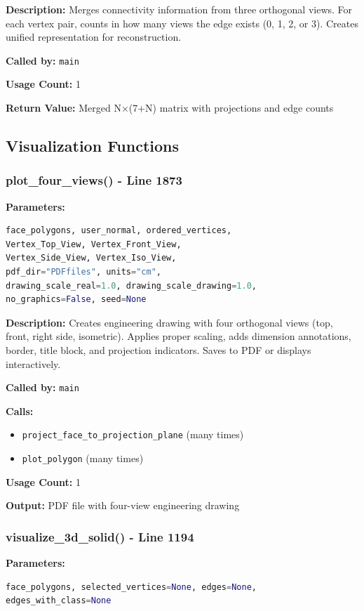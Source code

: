 \documentclass[11pt,a4paper]{article}
\begin{document}
\textbf{Description:}
Merges connectivity information from three orthogonal views. For each vertex pair, counts in how many views the edge exists (0, 1, 2, or 3). Creates unified representation for reconstruction.

\textbf{Called by:} \texttt{main}

\textbf{Usage Count:} 1

\textbf{Return Value:} Merged N×(7+N) matrix with projections and edge counts

\subsection{Visualization Functions}

\subsubsection{plot\_four\_views() - Line 1873}
\textbf{Parameters:}
\begin{lstlisting}[language=Python]
face_polygons, user_normal, ordered_vertices,
Vertex_Top_View, Vertex_Front_View, 
Vertex_Side_View, Vertex_Iso_View,
pdf_dir="PDFfiles", units="cm",
drawing_scale_real=1.0, drawing_scale_drawing=1.0,
no_graphics=False, seed=None
\end{lstlisting}

\textbf{Description:}
Creates engineering drawing with four orthogonal views (top, front, right side, isometric). Applies proper scaling, adds dimension annotations, border, title block, and projection indicators. Saves to PDF or displays interactively.

\textbf{Called by:} \texttt{main}

\textbf{Calls:}
\begin{itemize}
    \item \texttt{project\_face\_to\_projection\_plane} (many times)
    \item \texttt{plot\_polygon} (many times)
\end{itemize}

\textbf{Usage Count:} 1

\textbf{Output:} PDF file with four-view engineering drawing

\subsubsection{visualize\_3d\_solid() - Line 1194}
\textbf{Parameters:}
\begin{lstlisting}[language=Python]
face_polygons, selected_vertices=None, edges=None, 
edges_with_class=None
\end{lstlisting}
\end{document}
